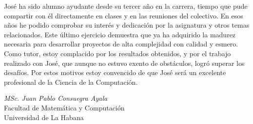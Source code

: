 \begin{opinion}
	José ha sido alumno ayudante desde su tercer año en la carrera, tiempo que pude compartir con él directamente en clases y en las reuniones del colectivo. En esos años he podido comprobar su interés y dedicación por la asignatura y otros temas relacionados. Este último ejercicio demuestra que ya ha adquirido la madurez necesaria para desarrollar proyectos de alta complejidad con calidad y esmero. Como tutor, estoy complacido por los resultados obtenidos, y por el trabajo realizado con José, que aunque no estuvo exento de obstáculos, logró superar los desafíos. Por estos motivos estoy convencido de que José será un excelente profesional de la Ciencia de la Computación.

	\vspace{1cm}
	\begin{flushright}
		\emph{MSc. Juan Pablo Consuegra Ayala}\\
		Facultad de Matemática y Computación\\
		Universidad de La Habana
	\end{flushright}
\end{opinion}